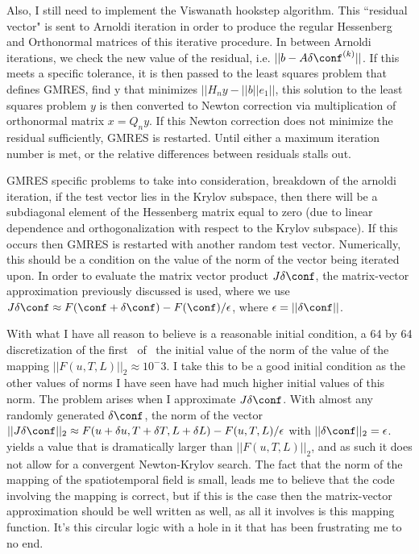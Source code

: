 

Also, I still need to implement the Viswanath hookstep algorithm.
This ``residual vector" is sent to Arnoldi iteration in order to produce the
regular Hessenberg and Orthonormal matrices of this iterative procedure. In
between Arnoldi iterations, we check the new value of the residual, i.e.
$||b-A\delta\conf^{(k)}||$. If this meets a specific tolerance, it is then
passed to the least squares problem that defines GMRES, find
y that minimizes $||H_n y - ||b|| e_1||$, this solution to the least squares
problem $y$ is then converted to Newton correction via multiplication of
orthonormal matrix $x = Q_n y$. If this Newton correction does not minimize
the residual sufficiently, GMRES is restarted. Until either a maximum
iteration number is met, or the relative differences between residuals stalls
out.

GMRES specific problems to take into consideration,
breakdown of the arnoldi iteration, if the test vector lies in the Krylov subspace,
then there will be a subdiagonal element of the
 Hessenberg matrix equal to zero (due to linear
  dependence and orthogonalization with
respect to the Krylov subspace). If this occurs then
 GMRES is restarted with another random test vector.
Numerically, this should be a condition on the value of the norm
of the vector being iterated upon.
In order to evaluate the matrix vector product $J \delta \conf$, the matrix-vector approximation previously discussed is used, where
we use $J\delta \conf \approx F(\conf +\delta \conf) - F(\conf) / \epsilon$, where $\epsilon = ||\delta \conf||$.


With what I have all reason to believe is a reasonable initial condition, a 64 by 64 discretization
of the first \ppo\ of \KS\ the initial value of the norm of the value of the mapping
$||F(u,T,L)||_2 \approx 10^-3$. I take this to be a good initial condition as the other values of norms
I have seen have had much higher initial values of this norm. The problem arises when I approximate
$J \delta \conf$. With almost any randomly generated $\delta \conf$, the norm of the vector $||J \delta \conf||_2
\approx F(u+\delta u, T + \delta T, L + \delta L) - F(u,T,L) / \epsilon $ with $||\delta \conf||_2 = \epsilon$.
yields a value that is dramatically larger than $||F(u,T,L)||_2$, and as such it does not allow for a convergent
Newton-Krylov search. The fact that the norm of the mapping of the spatiotemporal field is small, leads me to
believe that the code involving the mapping is correct, but if this is the case then the matrix-vector approximation
should be well written as well, as all it involves is this mapping function. It's this circular logic
with a hole in it that has been frustrating me to no end.

